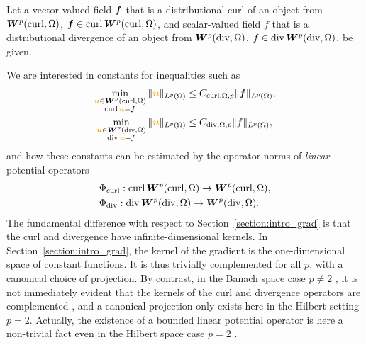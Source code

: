 \documentclass[10pt,letterpaper]{article}
\newcommand\cye[1]{%
  \protect\leavevmode
  \begingroup
    \color{red!35!yellow}%
    #1%
  \endgroup
}
\begin{document}
\cye{Let a vector-valued field $\bm{f}$ that is a distributional curl of an object from $\bm{W}^{p}(\operatorname{curl},\Omega)$, $\bm{f} \in \operatorname{curl} \bm{W}^{p}(\operatorname{curl},\Omega)$, and scalar-valued field $f$ that is a distributional divergence of an object from $\bm{W}^{p}(\operatorname{div},\Omega)$, $f \in \operatorname{div} \bm{W}^{p}(\operatorname{div},\Omega)$, be given.} 
We are interested in constants for inequalities such as 
\begin{subequations}\label{math:pot_PF_curl_div} \begin{align}
    \min\limits_{ \substack{ \cye{\bfu} \in \bfW^{p}(\curl,\Omega) \\ \curl \cye{\bfu} = \bff } } 
    \| \cye{\bfu} \|_{L^{p}(\Omega)}
    &\leq 
    C_{\curl,\Omega,p}
    \| \bff \|_{L^{p}(\Omega)} \label{math:pot_PF_curl}
    ,
    \\
    \min\limits_{ \substack{ \cye{\bfu} \in \bfW^{p}(\divergence,\Omega) \\ \divergence \cye{\bfu} = f } } 
    \| \cye{\bfu} \|_{L^{p}(\Omega)}
    &\leq 
    C_{\divergence,\Omega,p}
    \| f \|_{L^{p}(\Omega)} \label{math:pot_PF_div}
    ,
\end{align}\end{subequations}
and how these constants can be estimated by the operator norms of {\em linear} potential operators 
\begin{align*}
    &\Phi_{\operatorname{curl}} : \operatorname{curl} \bm{W}^{p}(\operatorname{curl},\Omega) \rightarrow \bm{W}^{p}(\operatorname{curl},\Omega)
    ,
    \\
    &\Phi_{\operatorname{div}} : \operatorname{div} \bm{W}^{p}(\operatorname{div},\Omega) \rightarrow \bm{W}^{p}(\operatorname{div},\Omega)
    .
\end{align*}
The fundamental difference \cye{with respect to Section~\ref{section:intro_grad}} is that the curl and divergence have infinite-dimensional kernels. In Section~\ref{section:intro_grad}, the kernel of the gradient is the one-dimensional space of constant functions. It is thus trivially complemented for all $p$, with a canonical choice of projection. By contrast, in the Banach space case \cye{$p \neq 2$}, it is not immediately evident that the kernels of the curl and divergence operators are complemented\cye{,} and a canonical projection only exists here in the Hilbert setting $p=2$. \cye{Actually,} the existence of a bounded linear potential operator is \cye{here} a non-trivial fact even in the Hilbert space case \cye{$p = 2$}. 
\end{document}
